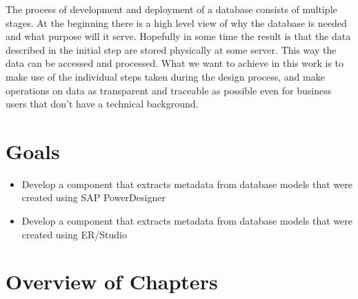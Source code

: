 \par
The process of development and deployment of a database consists of multiple stages. At the beginning there is a high level view of why the database is needed and what purpose will it serve. Hopefully in some time the result is that the data described in the initial step are stored physically at some server. 
This way the data can be accessed and processed. 
What we want to achieve in this work is to make use of the individual steps taken during the design process, and make operations on data as transparent and traceable as possible even for business users that don't have a technical background.

\section{Goals}

\begin{itemize}
	\item Develop a component that extracts metadata from database models that were created using SAP PowerDesigner 
	\item Develop a component that extracts metadata from database models that were created using ER/Studio  \\
\end{itemize}

\section{Overview of Chapters}


